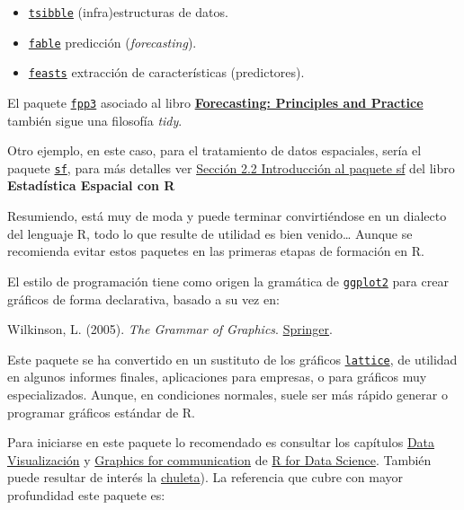 \documentclass[
]{book}
\providecommand{\tightlist}{%
  \setlength{\itemsep}{0pt}\setlength{\parskip}{0pt}}
\begin{document}
\begin{itemize}
\tightlist
\item
  \href{https://tsibble.tidyverts.org/}{\texttt{tsibble}} (infra)estructuras de datos.
\item
  \href{https://fable.tidyverts.org/}{\texttt{fable}} predicción (\emph{forecasting}).
\item
  \href{https://feasts.tidyverts.org/}{\texttt{feasts}} extracción de características (predictores).
\end{itemize}

El paquete \href{https://github.com/robjhyndman/fpp3package}{\texttt{fpp3}} asociado al libro \href{https://otexts.com/fpp3/}{\textbf{Forecasting: Principles and Practice}} también sigue una filosofía \emph{tidy}.

Otro ejemplo, en este caso, para el tratamiento de datos espaciales, sería el paquete \href{https://github.com/r-spatial/sf/}{\texttt{sf}}, para más detalles ver \href{https://rubenfcasal.github.io/estadistica_espacial/sf-intro.html}{Sección 2.2 Introducción al paquete sf} del libro \textbf{Estadística Espacial con R}

Resumiendo, está muy de moda y puede terminar convirtiéndose en un dialecto del lenguaje R, todo lo que resulte de utilidad es bien venido\ldots{} Aunque se recomienda evitar estos paquetes en las primeras etapas de formación en R.

El estilo de programación tiene como origen la gramática de \href{https://ggplot2.tidyverse.org}{\texttt{ggplot2}} para crear gráficos de forma declarativa, basado a su vez en:

Wilkinson, L. (2005). \emph{The Grammar of Graphics}. \href{https://www.google.es/books/edition/The_Grammar_of_Graphics/YGgUswEACAAJ?hl=es}{Springer}.

Este paquete se ha convertido en un sustituto de los gráficos \href{http://lattice.r-forge.r-project.org/}{\texttt{lattice}}, de utilidad en algunos informes finales, aplicaciones para empresas, o para gráficos muy especializados. Aunque, en condiciones normales, suele ser más rápido generar o programar gráficos estándar de R.

Para iniciarse en este paquete lo recomendado es consultar los capítulos \href{https://r4ds.had.co.nz/data-visualisation.html}{Data Visualización} y \href{https://r4ds.had.co.nz/graphics-for-communication.html}{Graphics for communication} de \href{https://r4ds.had.co.nz}{R for Data Science}.
También puede resultar de interés la \href{https://github.com/rstudio/cheatsheets/blob/master/data-visualization.pdf}{chuleta}).
La referencia que cubre con mayor profundidad este paquete es:
\end{document}
